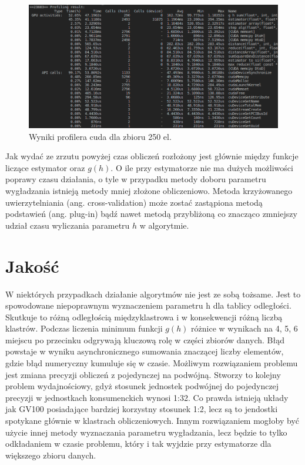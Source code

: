 \begin{figure}[H]
\includegraphics[width=\textwidth]{img/nvprof250}
\caption{Wyniki profilera cuda dla zbioru 250 el.}
\end{figure}
Jak wydać ze zrzutu powyżej czas obliczeń rozłożony jest głównie między funkcje liczące estymator oraz $g(h)$. O ile przy estymatorze nie ma dużych możliwości poprawy czasu działania, o tyle w przypadku metody doboru parametru wygładzania istnieją metody mniej złożone obliczeniowo. Metoda krzyżowanego uwierzytelniania (ang. cross-validation) może zostać zastąpiona metodą podstawień (ang. plug-in) bądź nawet metodą przybliżoną \cite{Kul05} co znacząco zmniejszy udział czasu wyliczania parametru $h$ w algorytmie.

\section{Jakość}
\label{sec:jakosc}
W niektórych przypadkach działanie algorytmów nie jest ze sobą tożsame. Jest to spowodowane niepoprawnym wyznaczeniem parametru h dla tablicy odległości. Skutkuje to różną odległością międzyklastrowa i w konsekwencji różną liczbą klastrów. Podczas liczenia minimum funkcji $g(h)$ różnice w wynikach na 4, 5, 6 miejscu po przecinku odgrywają kluczową rolę w części zbiorów danych. Błąd powstaje w wyniku asynchronicznego sumowania znaczącej liczby elementów, gdzie błąd numeryczny kumuluje się w czasie. Możliwym rozwiązaniem problemu jest zmiana precyzji obliczeń z pojedynczej na podwójną. Stworzy to kolejny problem wydajnościowy, gdyż stosunek jednostek podwójnej do pojedynczej precyzji w jednostkach konsumenckich wynosi 1:32. Co prawda istnieją układy jak GV100 posiadające bardziej korzystny stosunek 1:2, lecz są to jendostki spotykane głównie w klastrach obliczeniowych. Innym rozwiązaniem mogłoby być użycie innej metody wyznaczania parametru wygładzania, lecz będzie to tylko odkładaniem w czasie problemu, który i tak wyjdzie przy estymatorze dla większego zbioru danych.